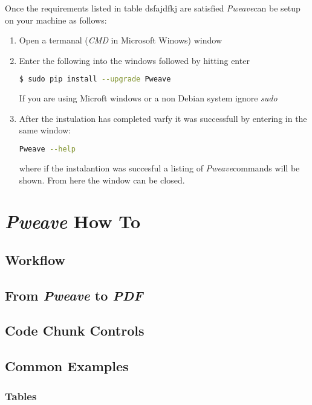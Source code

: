\documentclass[a4paper,11pt,final]{article}
\newcommand{\pweave}{\emph{Pweave}\space}
\begin{document}
  \noindent Once the requirements listed in table dsfajdfkj are satisfied \pweave can be setup on your machine as follows:
  \begin{enumerate}
     \item Open a termanal (\emph{CMD} in Microsoft Winows) window

     \item Enter the following into the windows followed by hitting enter
     \begin{center}

     \begin{lstlisting}[language=bash]
$ sudo pip install --upgrade Pweave
     \end{lstlisting}
     \end{center}
     If you are using Microft windows or a non Debian system ignore \emph{sudo}

     \item After the instulation has completed varfy it was successfull by entering in the same window:
     \begin{center}
     \begin{lstlisting}[language=bash]
Pweave --help
     \end{lstlisting}
     \end{center}
     where if the instalantion was succesful a listing of \pweave commands will be shown. From here the window can be closed.

  \end{enumerate}




\section{\emph{Pweave} How To}
  \subsection{Workflow}
  \subsection{From \emph{Pweave} to \emph{PDF}}
  \subsection{Code Chunk Controls}
  \subsection{Common Examples}
     \subsubsection{Tables}
\end{document}
